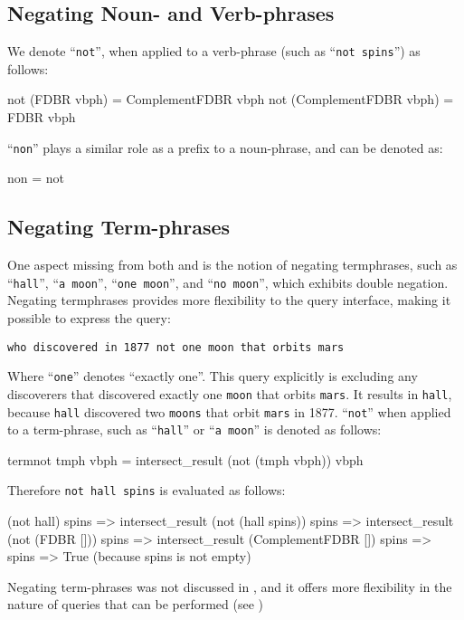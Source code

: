 \documentclass[../main.tex]{subfiles}
\begin{document}
\begin{refsection}
\subsection{Negating Noun- and Verb-phrases}

We denote ``\texttt{not}'', when applied to a verb-phrase (such as ``\texttt{not spins}'') as follows:
\begin{code}
    not (FDBR vbph) = ComplementFDBR vbph
    not (ComplementFDBR vbph) = FDBR vbph
\end{code}
``\texttt{non}'' plays a similar role as a prefix to a noun-phrase, and can be denoted as:
\begin{code}
    non = not
\end{code}

\subsection{Negating Term-phrases}

One aspect missing from both \cite{ferre2014squall} and \cite{frostboulos2002} is the notion
of negating termphrases, such as ``\texttt{hall}'', ``\texttt{a moon}'', ``\texttt{one moon}'', and ``\texttt{no moon}'', which exhibits double negation.  Negating termphrases provides more flexibility to the query interface, making it possible to express the query:

\begin{center}
	\texttt{who discovered in 1877 not one moon that orbits mars}
\end{center}
Where ``\texttt{one}'' denotes ``exactly one''.  This query explicitly is excluding any discoverers that discovered exactly one \texttt{moon} that orbits \texttt{mars}.  It results in \texttt{hall}, because \texttt{hall} discovered two \texttt{moons} that orbit \texttt{mars} in 1877.
``\texttt{not}'' when applied to a term-phrase, such as ``\texttt{hall}'' or ``\texttt{a moon}'' is denoted as follows:
\begin{code}
    termnot tmph vbph = intersect_result (not (tmph vbph)) vbph
\end{code}
Therefore \texttt{not hall spins} is evaluated as follows:
\begin{code}
       (not hall) spins
    => intersect_result (not (hall spins)) spins
    => intersect_result (not (FDBR [])) spins
    => intersect_result (ComplementFDBR []) spins
    => spins
    => True  (because spins is not empty)
\end{code}
Negating term-phrases was not discussed in \cite{frostboulos2002}, and it offers more flexibility
in the nature of queries that can be performed (see )



\end{refsection}
\end{document}
